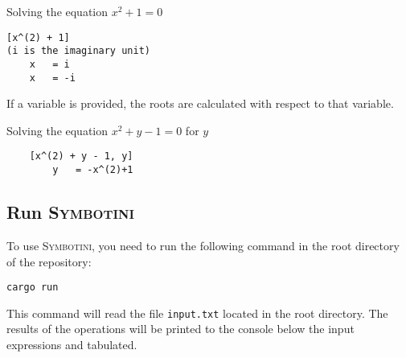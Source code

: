 \begin{exmp}
    {Solving the equation $x^2 + 1 = 0$}
    \begin{verbatim}
[x^(2) + 1]
(i is the imaginary unit)
    x   = i
    x   = -i
    \end{verbatim}
\end{exmp}

If a variable is provided, the roots are calculated with respect to that variable.

\begin{exmp}
    {Solving the equation $x^2 + y - 1 = 0$ for $y$}
    \begin{verbatim}
    [x^(2) + y - 1, y]
        y   = -x^(2)+1
    \end{verbatim}
\end{exmp}

\subsection{Run \textsc{Symbotini}}

To use \textsc{Symbotini}, you need to run the following command in the root directory of the repository:

\begin{verbatim}
cargo run
\end{verbatim}

This command will read the file \texttt{input.txt} located in the root directory.
The results of the operations will be printed to the console below the input expressions and tabulated.
